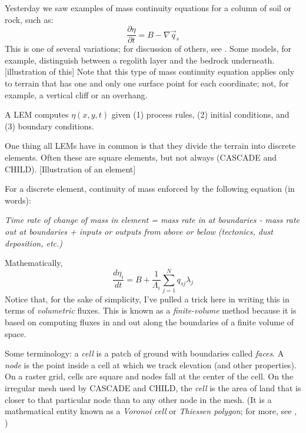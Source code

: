 \documentclass[12pt]{amsart}
\begin{document}
Yesterday we saw examples of mass continuity equations for a column of soil or rock, such as:
\begin{equation}
\frac{\partial \eta}{\partial t} = B - \nabla \vec{q}_s
\end{equation}
This is one of several variations; for discussion of others, see \cite{tucker2010modelling}. Some models, for example, distinguish between a regolith layer and the bedrock underneath. [illustration of this] Note that this type of mass continuity equation applies only to terrain that has one and only one surface point for each coordinate; not, for example, a vertical cliff or an overhang.

A LEM computes $\eta (x,y,t)$ given (1) process rules, (2) initial conditions, and (3) boundary conditions.

One thing all LEMs have in common is that they divide the terrain into discrete elements. Often these are square elements, but not always (CASCADE and CHILD). [Illustration of an element]

For a discrete element, continuity of mass enforced by the following equation (in words):

{\em Time rate of change of mass in element = mass rate in at boundaries - mass rate out at boundaries + inputs or outputs from above or below (tectonics, dust deposition, etc.)}

Mathematically, 
\begin{equation}
\label{eq:finvol}
\frac{d\eta_i}{dt} = B + \frac{1}{\Lambda_i} \sum_{j=1}^N q_{sj} \lambda_j
\end{equation}
Notice that, for the sake of simplicity, I've pulled a trick here in writing this in terms of {\em volumetric} fluxes. This is known as a {\em finite-volume} method because it is based on computing fluxes in and out along the boundaries of a finite volume of space.

Some terminology: a {\em cell} is a patch of ground with boundaries called {\em faces}. A {\em node} is the point inside a cell at which we track elevation (and other properties). On a raster grid, cells are square and nodes fall at the center of the cell. On the irregular mesh used by CASCADE and CHILD, the {\em cell} is the area of land that is closer to that particular node than to any other node in the mesh. (It is a mathematical entity known as a {\em Voronoi cell} or {\em Thiessen polygon}; for more, see \citet{braun1997modelling}, \citet{tucker2001object})
\end{document}
